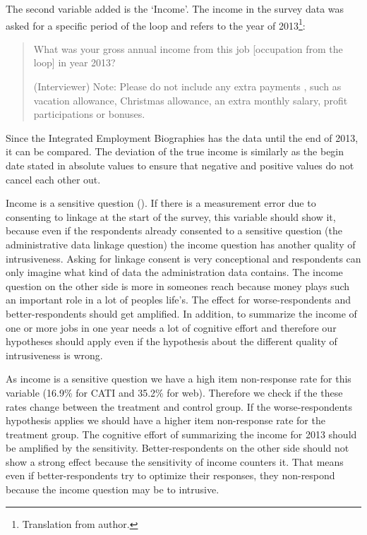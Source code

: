 The second variable added is the `Income'. The income in the survey data was asked for a specific period of the loop and refers to the year of 2013\footnote{Translation from author.}:


\begin{quote}
\begin {small}

What was your gross annual income from this job [occupation from the loop] in year 2013?

(Interviewer) Note: Please do not include any extra payments , such as vacation allowance, Christmas allowance, an extra monthly salary, profit participations or bonuses.

\end{small}
\end{quote}


Since the Integrated Employment Biographies has the data until the end of 2013, it can be compared. The deviation of the true income is similarly as the begin date stated in absolute values to ensure that negative and positive values do not cancel each other out.

Income is a sensitive question (\cite{Tourangeauetal07}). If there is a measurement error due to consenting to linkage at the start of the survey, this variable should show it, because even if the respondents already consented to a sensitive question (the administrative data linkage question) the income question has another quality of intrusiveness. Asking for linkage consent is very conceptional and respondents can only imagine what kind of data the administration data contains. The income question on the other side is more in someones reach because money plays such an important role in a lot of peoples life's. The effect for worse-respondents and better-respondents should get amplified. In addition, to summarize the income of one or more jobs in one year needs a lot of cognitive effort and therefore our hypotheses should apply even if the hypothesis about the different quality of intrusiveness is wrong.

As income is a sensitive question we have a high item non-response rate for this variable (16.9\% for CATI and 35.2\% for web). Therefore we check if the these rates change between the treatment and control group. If the worse-respondents hypothesis applies we should have a higher item non-response rate for the treatment group. The cognitive effort of summarizing the income for 2013 should be amplified by the sensitivity. Better-respondents on the other side should not show a strong effect because the sensitivity of income counters it. That means even if better-respondents try to optimize their responses, they non-respond because the income question may be to intrusive.


